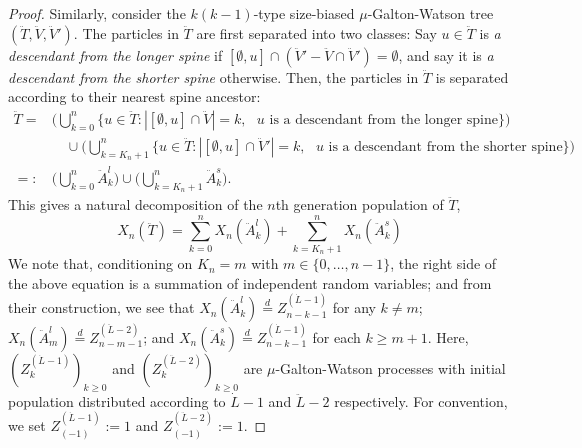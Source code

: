 \documentclass[12pt,a4paper]{amsart}
\numberwithin{equation}{section}
\begin{document}
\begin{proof}
	Similarly, consider the $k(k-1)$-type size-biased $\mu$-Galton-Watson tree $(\ddot T,\ddot V,\ddot V')$.
	The particles in $\ddot T$ are first separated into two classes: Say $u \in \ddot T$ is \emph{a descendant from the longer spine} if $[\emptyset , u] \cap (\ddot V' - \ddot V \cap \ddot V') = \emptyset$, and say it is \emph{a descendant from the shorter spine} otherwise.
	Then, the particles in $\ddot T$ is separated according to their nearest spine ancestor:
\begin{equation*}\begin{split}
	\ddot T
	=&\Big( \bigcup_{k=0}^n \{u\in\ddot T: | [\emptyset, u]\cap \ddot V | = k, \text{ $u$ is a descendant from the longer spine}\} \Big)
	\\&\quad \cup \Big( \bigcup_{k= K_n+1}^n \{u\in\ddot T: | [\emptyset, u]\cap \ddot V' | = k, \text{ $u$ is a descendant from the shorter spine}\}  \Big)
	\\=:& 	\Big ( \bigcup_{k=0}^n \ddot A^l_k\Big)  \cup \Big( \bigcup_{k=K_n+1}^n \ddot A^s_k \Big).
\end{split}\end{equation*}
	This gives a natural decomposition of the $n$th generation population of $\ddot T$,
\begin{equation}\label{eq:rawtwospinedecomposition}
		X_n(\ddot T)
	=
		\sum_{k=0}^nX_n(\ddot A^l_k) + \sum_{k=K_n + 1}^n X_n(\ddot A^s_k)
\end{equation}
	We note that, conditioning on $K_n = m$ with $m\in\{0,\dots,n-1\}$, the right side of the above equation is a summation of independent random variables; and from their construction, we see that
	$X_n(\ddot A^l_k) \overset{d}{=} Z^{(\dot L - 1)}_{n-k-1}$ for any $k \neq m$;
	$X_n(\ddot A^l_m) \overset{d}{=} Z^{(\ddot L - 2)}_{n-m-1}$;
	and $X_n(\ddot A^s_k) \overset{d}{=} Z^{(\dot L - 1)}_{n-k-1}$ for each $k \geq m+1$.
	Here, $(Z^{(\dot L - 1)}_k)_{k\ge 0}$ and $(Z^{(\ddot L - 2)}_k)_{k\ge 0}$ are $\mu$-Galton-Watson processes with initial population distributed according to $\dot L-1$ and $\ddot L-2$ respectively.
	For convention, we set $Z^{(\dot L - 1)}_{(-1)}:= 1$ and $Z^{(\ddot L - 2)}_{(-1)}:= 1$.


\end{proof}
\end{document}
